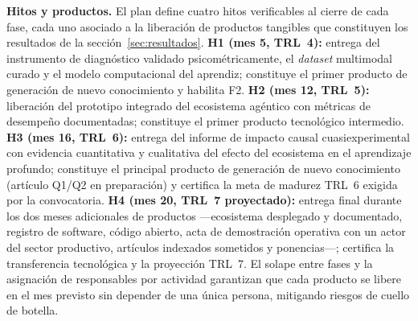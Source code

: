\medskip


\noindent\textbf{Hitos y productos.}
El plan define cuatro hitos verificables al cierre de cada fase, cada uno
asociado a la liberación de productos tangibles que constituyen los resultados de
la sección~\ref{sec:resultados}. \textbf{H1 (mes 5, TRL~4):} entrega del
instrumento de diagnóstico validado psicométricamente, el \emph{dataset}
multimodal curado y el modelo computacional del aprendiz; constituye el primer
producto de generación de nuevo conocimiento y habilita F2. \textbf{H2 (mes 12,
TRL~5):} liberación del prototipo integrado del ecosistema agéntico con métricas
de desempeño documentadas; constituye el primer producto tecnológico
intermedio. \textbf{H3 (mes 16, TRL~6):} entrega del informe de impacto causal
cuasiexperimental con evidencia cuantitativa y cualitativa del efecto del
ecosistema en el aprendizaje profundo; constituye el principal producto de
generación de nuevo conocimiento (artículo Q1/Q2 en preparación) y certifica la
meta de madurez TRL~6 exigida por la convocatoria. \textbf{H4 (mes 20, TRL~7
proyectado):} entrega final durante los dos meses adicionales de productos
—ecosistema desplegado y documentado, registro de software, código abierto,
acta de demostración operativa con un actor del sector productivo, artículos
indexados sometidos y ponencias—; certifica la transferencia tecnológica y la
proyección TRL~7. El solape entre fases y la asignación de responsables por
actividad garantizan que cada producto se libere en el mes previsto sin
depender de una única persona, mitigando riesgos de cuello de botella.
